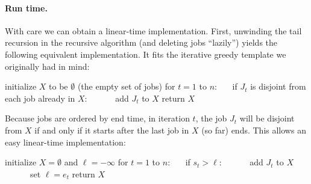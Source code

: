 \paragraph{Run time.}
With care we can obtain a linear-time implementation.
First, unwinding the tail recursion in the recursive algorithm
(and deleting jobs ``lazily'')
yields the following equivalent implementation.
It fits the iterative greedy template we originally had in mind:

\begin{myframed}
  \begin{steps}
  \item[{{\sf iselect}$(I=\{J_1,J_2,\ldots,J_n\})$:}]
    \step initialize $X$ to be $\emptyset$ (the empty set of jobs)
    \step for $t = 1$ to $n$:
    \step~~~if $J_t$ is disjoint from each job already in $X$:
    \step~~~~~~add $J_t$ to $X$
    \step return $X$
  \end{steps}
\end{myframed}

Because jobs are ordered by end time,
in iteration $t$, the job $J_t$ will be disjoint from $X$
if and only if it starts after the last job in $X$ (so far) ends.
This allows an easy linear-time implementation:

\begin{myframed}
  \begin{steps}
  \item[{{\sf iselect}$(I=\{J_1,J_2,\ldots,J_n\})$:}]
    \step initialize $X = \emptyset$ and $\ell = -\infty$
    \step for $t =1$ to $n$:
    \step~~~if $s_t > \ell$:
    \step~~~~~~add $J_t$ to $X$
    \step~~~~~~set $\ell  = e_t$
    \step return $X$
  \end{steps}
\end{myframed}


